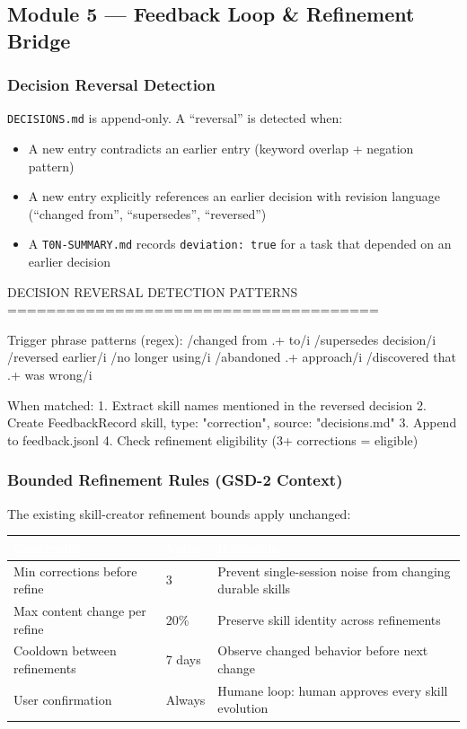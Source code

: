 \documentclass[11pt,letterpaper]{article}
\newcommand{\tableheader}[1]{\textbf{\sffamily\textcolor{white}{#1}}}
\begin{document}
\subsection{Module 5 --- Feedback Loop \& Refinement Bridge}

\subsubsection{Decision Reversal Detection}

\texttt{DECISIONS.md} is append-only. A ``reversal'' is detected when:
\begin{itemize}
  \item A new entry contradicts an earlier entry (keyword overlap + negation pattern)
  \item A new entry explicitly references an earlier decision with revision language (``changed from'', ``supersedes'', ``reversed'')
  \item A \texttt{T0N-SUMMARY.md} records \texttt{deviation: true} for a task that depended on an earlier decision
\end{itemize}

\begin{asciibox}
DECISION REVERSAL DETECTION PATTERNS
======================================

Trigger phrase patterns (regex):
  /changed from .+ to/i
  /supersedes decision/i
  /reversed earlier/i
  /no longer using/i
  /abandoned .+ approach/i
  /discovered that .+ was wrong/i

When matched:
  1. Extract skill names mentioned in the reversed decision
  2. Create FeedbackRecord{ skill, type: "correction", source: "decisions.md" }
  3. Append to feedback.jsonl
  4. Check refinement eligibility (3+ corrections = eligible)
\end{asciibox}

\subsubsection{Bounded Refinement Rules (GSD-2 Context)}

The existing skill-creator refinement bounds apply unchanged:

\begin{center}
\begin{tabularx}{\textwidth}{L{4cm}C{2.5cm}X}
\toprule
{}
\tableheader{Constraint} & \tableheader{Value} & \tableheader{Rationale} \\
\midrule
Min corrections before refine & 3 & Prevent single-session noise from changing durable skills \\
Max content change per refine & 20\% & Preserve skill identity across refinements \\
Cooldown between refinements & 7 days & Observe changed behavior before next change \\
User confirmation & Always & Humane loop: human approves every skill evolution \\
\bottomrule
\end{tabularx}
\end{center}
\end{document}
